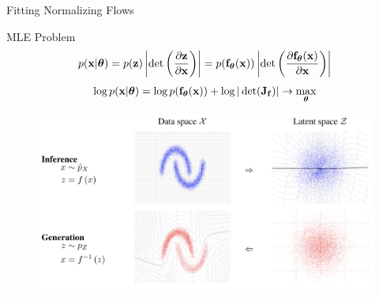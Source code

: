 \documentclass{beamer}
\begin{document}
\begin{frame}{Fitting Normalizing Flows}
	\begin{block}{MLE Problem}
		\vspace{-0.3cm}
		\[
		p(\mathbf{x}|\boldsymbol{\theta}) = p(\mathbf{z}) \left|\det \left(  \frac{\partial \mathbf{z}}{\partial \mathbf{x}} \right) \right|  = p(\mathbf{f}_{\boldsymbol{\theta}}(\mathbf{x})) \left|\det \left( \frac{\partial \mathbf{f}_{\boldsymbol{\theta}}(\mathbf{x})}{\partial \mathbf{x}} \right) \right|
		\]
		\[
		\log p(\mathbf{x}|\boldsymbol{\theta}) = \log p(\mathbf{f}_{\boldsymbol{\theta}}(\mathbf{x})) + \log  |\det (\mathbf{J}_{\mathbf{f}}) | \rightarrow \max_{\boldsymbol{\theta}}
		\]
	\end{block}
	\vspace{-0.2cm}
	\begin{figure}
		\includegraphics[width=0.85\linewidth]{figs/flows_how2}
	\end{figure}
\end{frame}
\end{document}
